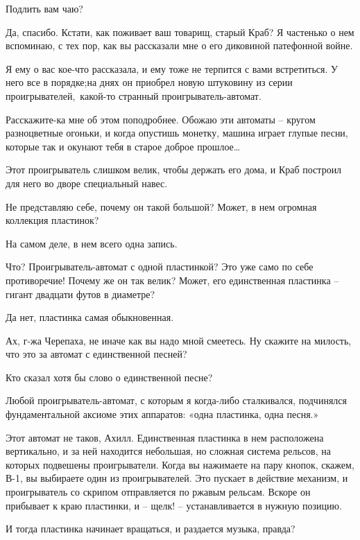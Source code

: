 \documentclass[../main.tex]{subfiles}
\begin{document}
\begin{dialogue}
 Подлить вам чаю?

 Да, спасибо. Кстати, как поживает ваш товарищ, старый Краб? Я частенько о нем вспоминаю, с тех пор, как вы рассказали мне о его диковиной патефонной войне.

 Я ему о вас кое-что рассказала, и ему тоже не терпится с вами встретиться. У него все в порядке;на днях он приобрел новую штуковину из серии проигрывателей,~какой-то странный проигрыватель-автомат.

 Расскажите-ка мне об этом поподробнее. Обожаю эти автоматы \--- кругом разноцветные огоньки, и когда опустишь монетку, машина играет глупые песни, которые так и окунают тебя в старое доброе прошлое\ldots{}

 Этот проигрыватель слишком велик, чтобы держать его дома, и Краб построил для него во дворе специальный навес.

 Не представляю себе, почему он такой большой? Может, в нем огромная коллекция пластинок?

 На самом деле, в нем всего одна запись.

 Что? Проигрыватель-автомат с одной пластинкой? Это уже само по себе противоречие! Почему же он так велик? Может, его единственная пластинка \--- гигант двадцати футов в диаметре?

 Да нет, пластинка самая обыкновенная.

 Ах, г-жа Черепаха, не иначе как вы надо мной смеетесь. Ну скажите на милость, что это за автомат с единственной песней?

 Кто сказал хотя бы слово о единственной песне?

 Любой проигрыватель-автомат, с которым я когда-либо сталкивался, подчинялся фундаментальной аксиоме этих аппаратов: «одна пластинка, одна песня.»

 Этот автомат не таков, Ахилл. Единственная пластинка в нем расположена вертикально, и за ней находится небольшая, но сложная система рельсов, на которых подвешены проигрыватели. Когда вы нажимаете на пару кнопок, скажем, В-1, вы выбираете один из проигрывателей. Это пускает в действие механизм, и проигрыватель со скрипом отправляется по ржавым рельсам. Вскоре он прибывает к краю пластинки, и \--- щелк! \--- устанавливается в нужную позицию.

 И тогда пластинка начинает вращаться, и раздается музыка, правда?


\end{dialogue}
\end{document}

